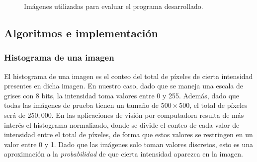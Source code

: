 \documentclass[12pt]{article}
\begin{document}
 \begin{figure}[htbp]
	\centering
	\quad
	\quad
	\caption{Imágenes utilizadas para evaluar el programa desarrollado.}
	\label{img:test_imgs}
\end{figure}



\subsection{Algoritmos e implementación}

\subsubsection{Histograma de una imagen}

El histograma de una imagen es el conteo del total de píxeles de cierta intensidad presentes en dicha imagen. En nuestro caso, dado que se maneja una escala de grises con 8 bits, la intensidad toma valores entre 0 y 255. 
Además, dado que todas las imágenes de prueba tienen un tamaño de $500\times500$, el total de píxeles será de $250,000$. En las aplicaciones de visión por computadora resulta de más interés el histograma normalizado,
donde se divide el conteo de cada valor de intensidad entre el total de píxeles, de forma que estos valores se restringen en un valor entre 0 y 1. Dado que las imágenes solo toman valores discretos, esto es una aproximación a la \textit{probabilidad} de que cierta intensidad aparezca 
en la imagen.
\end{document}
